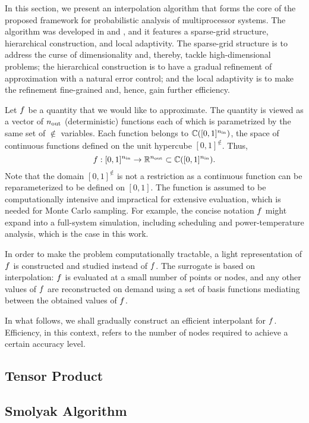 In this section, we present an interpolation algorithm that forms the core of
the proposed framework for probabilistic analysis of multiprocessor systems. The
algorithm was developed in \cite{klimke2006} and \cite{ma2009}, and it features
a sparse-grid structure, hierarchical construction, and local adaptivity. The
sparse-grid structure is to address the curse of dimensionality and, thereby,
tackle high-dimensional problems; the hierarchical construction is to have a
gradual refinement of approximation with a natural error control; and the local
adaptivity is to make the refinement fine-grained and, hence, gain further
efficiency.

Let $f$ be a quantity that we would like to approximate. The quantity is viewed
as a vector of ${n_\text{out}}$ (deterministic) functions each of which is parametrized
by the same set of $\nin$ variables. Each function belongs to $\mathbb{C}([0,
1]^{n_\text{in}})$, the space of continuous functions defined on the unit hypercube $[0,
1]^\nin$. Thus,
\[
  f: [0, 1]^{n_\text{in}} \to \mathbb{R}^{n_\text{out}} \subset \mathbb{C}([0, 1]^{n_\text{in}}).
\]
Note that the domain $[0, 1]^\nin$ is not a restriction as a continuous function
can be reparameterized to be defined on $[0, 1]$. The function is assumed to be
computationally intensive and impractical for extensive evaluation, which is
needed for Monte Carlo sampling. For example, the concise notation $f$ might
expand into a full-system simulation, including scheduling and power-temperature
analysis, which is the case in this work.

In order to make the problem computationally tractable, a light representation
of $f$ is constructed and studied instead of $f$. The surrogate is based on
interpolation: $f$ is evaluated at a small number of points or nodes, and any
other values of $f$ are reconstructed on demand using a set of basis functions
mediating between the obtained values of $f$.

In what follows, we shall gradually construct an efficient interpolant for $f$.
Efficiency, in this context, refers to the number of nodes required to achieve a
certain accuracy level.

\subsection{Tensor Product} 


\subsection{Smolyak Algorithm} 


